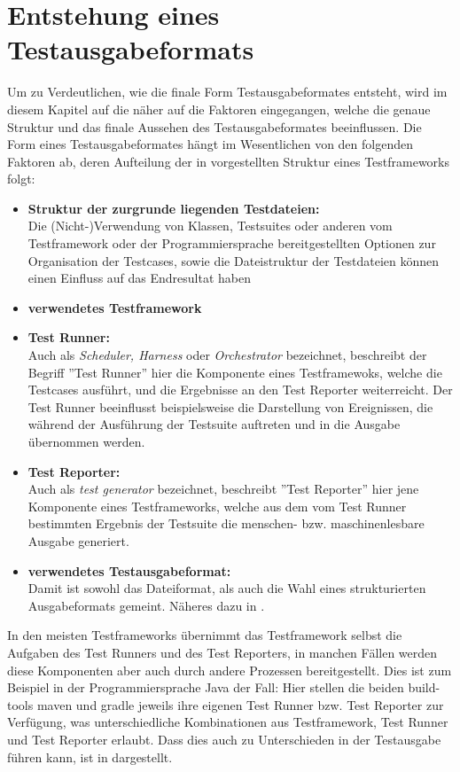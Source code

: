 \section{Entstehung eines Testausgabeformats}
Um zu Verdeutlichen, wie die finale Form Testausgabeformates entsteht, wird im diesem Kapitel auf die näher auf die Faktoren eingegangen, welche die genaue Struktur und das finale Aussehen des Testausgabeformates beeinflussen.
Die Form eines Testausgabeformates hängt im Wesentlichen von den folgenden Faktoren ab, deren Aufteilung der in \cite{winkler} vorgestellten Struktur eines Testframeworks folgt: %
\begin{itemize}
    \item \textbf{Struktur der zurgrunde liegenden Testdateien:}\\
    Die (Nicht-)Verwendung von Klassen, Testsuites oder anderen vom Testframework oder der Programmiersprache bereitgestellten Optionen zur Organisation der Testcases, sowie die Dateistruktur der Testdateien können einen Einfluss auf das Endresultat haben
    \item \textbf{verwendetes Testframework}
    \item \textbf{Test Runner:}\\
    Auch als \textit{Scheduler, Harness} oder \textit{Orchestrator} bezeichnet, beschreibt der Begriff ''Test Runner'' hier die Komponente eines Testframewoks, welche die Testcases ausführt, und die Ergebnisse an den Test Reporter weiterreicht. Der Test Runner beeinflusst beispielsweise die Darstellung von Ereignissen, die während der Ausführung der Testsuite auftreten und in die Ausgabe übernommen werden.
    \item \textbf{Test Reporter:}\\
    Auch als \textit{test generator} bezeichnet, beschreibt ''Test Reporter'' hier jene Komponente eines Testframeworks, welche aus dem vom Test Runner bestimmten Ergebnis der Testsuite die menschen- bzw. maschinenlesbare Ausgabe generiert.
    \item \textbf{verwendetes Testausgabeformat:}\\
    Damit ist sowohl das Dateiformat, als auch die Wahl eines strukturierten Ausgabeformats gemeint. Näheres dazu in .
\end{itemize}
In den meisten Testframeworks übernimmt das Testframework selbst die Aufgaben des Test Runners und des Test Reporters, in manchen Fällen werden diese Komponenten aber auch durch andere Prozessen bereitgestellt. Dies ist zum Beispiel in der Programmiersprache Java der Fall: Hier stellen die beiden build-tools maven und gradle jeweils ihre eigenen Test Runner bzw. Test Reporter zur Verfügung, was unterschiedliche Kombinationen aus Testframework, Test Runner und Test Reporter erlaubt. Dass dies auch zu Unterschieden in der Testausgabe führen kann, ist in  dargestellt.

